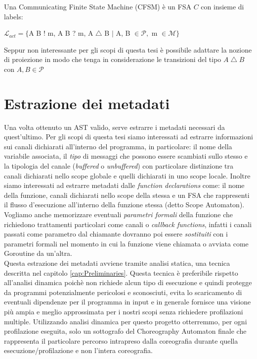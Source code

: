 \begin{definition}
    Una Communicating Finite State Machine (CFSM) è un FSA $C$ con insieme di labels:
    \bigskip \\
    \centerline{$\mathcal{L}_{act} = \{$A B ! m, A B ? m, A $\bigtriangleup$ B $|$ A, B $ \in \mathcal{P},$ m $ \in \mathcal{M}\}$}
\end{definition}

\begin{remark}
    Seppur non interessante per gli scopi di questa tesi è possibile adattare la nozione di proiezione in modo che tenga in considerazione le transizioni del tipo $A \bigtriangleup B$ con $A, B \in \mathcal{P}$
\end{remark}


\section{Estrazione dei metadati}
Una volta ottenuto un AST valido, serve estrarre i metadati necessari da quest'ultimo. Per gli scopi di questa tesi siamo interessati ad estrarre informazioni sui canali dichiarati all'interno del programma, in particolare: il nome della variabile associata, il \emph{tipo} di messaggi che possono essere scambiati sullo stesso e la tipologia del canale (\emph{buffered} o \emph{unbuffered}) con particolare distinzione tra canali dichiarati nello scope globale e quelli dichiarati in uno scope locale. Inoltre siamo interessati ad estrarre metadati dalle \emph{function declarations} come: il nome della funzione, canali dichiarati nello scope della stessa e un FSA che rappresenti il flusso d'esecuzione all'interno della funzione stessa (detto Scope Automaton). Vogliamo anche memorizzare eventuali \emph{parametri formali} della funzione che richiedono trattamenti particolari come canali o \emph{callback functions}, infatti i canali passati come parametro dal chiamante dovranno poi essere \emph{sostituiti} con i parametri formali nel momento in cui la funzione viene chiamata o avviata come Goroutine da un'altra. \bigskip \\
Questa estrazione dei metadati avviene tramite analisi statica, una tecnica descritta nel capitolo \ref{cap:Preliminaries}. Questa tecnica è preferibile rispetto all'analisi dinamica poichè non richiede alcun tipo di esecuzione e quindi protegge da programmi potenzialmente pericolosi e sconosciuti, evita lo scaricamento di eventuali dipendenze per il programma in input e in generale fornisce una visione più ampia e meglio approssimata per i nostri scopi senza richiedere profilazioni multiple. Utilizzando analisi dinamica per questo progetto otterremmo, per ogni profilazione eseguita, solo un sottografo del Choreography Automaton finale che rappresenta il particolare percorso intrapreso dalla coreografia durante quella esecuzione/profilazione e non l'intera coreografia.

